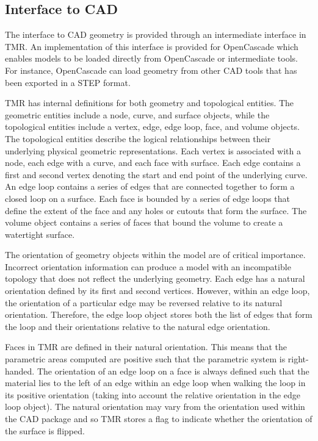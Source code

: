 \documentclass[12pt]{article}
\begin{document}
\subsection{Interface to CAD}

The interface to CAD geometry is provided through an intermediate interface in TMR. 
An implementation of this interface is provided for OpenCascade which enables models to be loaded directly from OpenCascade or intermediate tools. 
For instance, OpenCascade can load geometry from other CAD tools that has been exported in a STEP format. 

TMR has internal definitions for both geometry and topological entities.
The geometric entities include a node, curve, and surface objects, while the topological entities include a vertex, edge, edge loop, face, and volume objects.
The topological entities describe the logical relationships between their underlying physical geometric representations.
Each vertex is associated with a node, each edge with a curve, and each face with surface.
Each edge contains a first and second vertex denoting the start and end point of the underlying curve.
An edge loop contains a series of edges that are connected together to form a closed loop on a surface.
Each face is bounded by a series of edge loops that define the extent of the face and any holes or cutouts that form the surface.
The volume object contains a series of faces that bound the volume to create a watertight surface.

The orientation of geometry objects within the model are of critical importance.
Incorrect orientation information can produce a model with an incompatible topology that does not reflect the underlying geometry.
Each edge has a natural orientation defined by its first and second vertices.
However, within an edge loop, the orientation of a particular edge may be reversed relative to its natural orientation. 
Therefore, the edge loop object stores both the list of edges that form the loop and their orientations relative to the natural edge orientation.

Faces in TMR are defined in their natural orientation.
This means that the parametric areas computed are positive such that the parametric system is right-handed.
The orientation of an edge loop on a face is always defined such that the material lies to the left of an edge within an edge loop when walking the loop in its positive orientation (taking into account the relative orientation in the edge loop object). 
The natural orientation may vary from the orientation used within the CAD package and so TMR stores a flag to indicate whether the orientation of the surface is flipped.
\end{document}
